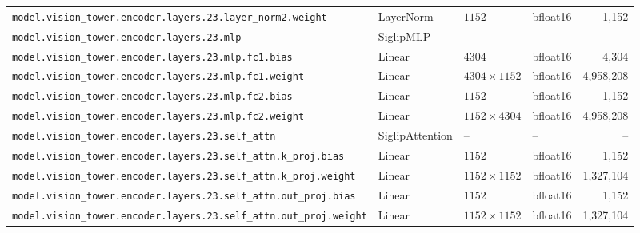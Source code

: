 \documentclass[10pt,a4paper]{article}
\theoremstyle{definition}
\begin{document}
\begin{appendices}
{\begin{longtable}{p{6.8cm}>{\raggedright\arraybackslash}p{3.3cm}llr}
\texttt{model.\allowbreak{}vision\_tower.\allowbreak{}encoder.\allowbreak{}layers.\allowbreak{}23.\allowbreak{}layer\_norm2.\allowbreak{}weight} & Layer\allowbreak{}Norm & $1152$ & bfloat16 & 1,152 \\
\texttt{model.\allowbreak{}vision\_tower.\allowbreak{}encoder.\allowbreak{}layers.\allowbreak{}23.\allowbreak{}mlp} & Siglip\allowbreak{}MLP & -- & -- & -- \\
\texttt{model.\allowbreak{}vision\_tower.\allowbreak{}encoder.\allowbreak{}layers.\allowbreak{}23.\allowbreak{}mlp.\allowbreak{}fc1.\allowbreak{}bias} & Linear & $4304$ & bfloat16 & 4,304 \\
\texttt{model.\allowbreak{}vision\_tower.\allowbreak{}encoder.\allowbreak{}layers.\allowbreak{}23.\allowbreak{}mlp.\allowbreak{}fc1.\allowbreak{}weight} & Linear & $4304 \times 1152$ & bfloat16 & 4,958,208 \\
\texttt{model.\allowbreak{}vision\_tower.\allowbreak{}encoder.\allowbreak{}layers.\allowbreak{}23.\allowbreak{}mlp.\allowbreak{}fc2.\allowbreak{}bias} & Linear & $1152$ & bfloat16 & 1,152 \\
\texttt{model.\allowbreak{}vision\_tower.\allowbreak{}encoder.\allowbreak{}layers.\allowbreak{}23.\allowbreak{}mlp.\allowbreak{}fc2.\allowbreak{}weight} & Linear & $1152 \times 4304$ & bfloat16 & 4,958,208 \\
\texttt{model.\allowbreak{}vision\_tower.\allowbreak{}encoder.\allowbreak{}layers.\allowbreak{}23.\allowbreak{}self\_attn} & Siglip\allowbreak{}Attention & -- & -- & -- \\
\texttt{model.\allowbreak{}vision\_tower.\allowbreak{}encoder.\allowbreak{}layers.\allowbreak{}23.\allowbreak{}self\_attn.\allowbreak{}k\_proj.\allowbreak{}bias} & Linear & $1152$ & bfloat16 & 1,152 \\
\texttt{model.\allowbreak{}vision\_tower.\allowbreak{}encoder.\allowbreak{}layers.\allowbreak{}23.\allowbreak{}self\_attn.\allowbreak{}k\_proj.\allowbreak{}weight} & Linear & $1152 \times 1152$ & bfloat16 & 1,327,104 \\
\texttt{model.\allowbreak{}vision\_tower.\allowbreak{}encoder.\allowbreak{}layers.\allowbreak{}23.\allowbreak{}self\_attn.\allowbreak{}out\_proj.\allowbreak{}bias} & Linear & $1152$ & bfloat16 & 1,152 \\
\texttt{model.\allowbreak{}vision\_tower.\allowbreak{}encoder.\allowbreak{}layers.\allowbreak{}23.\allowbreak{}self\_attn.\allowbreak{}out\_proj.\allowbreak{}weight} & Linear & $1152 \times 1152$ & bfloat16 & 1,327,104 \\

\end{longtable}}
\end{appendices}
\end{document}
